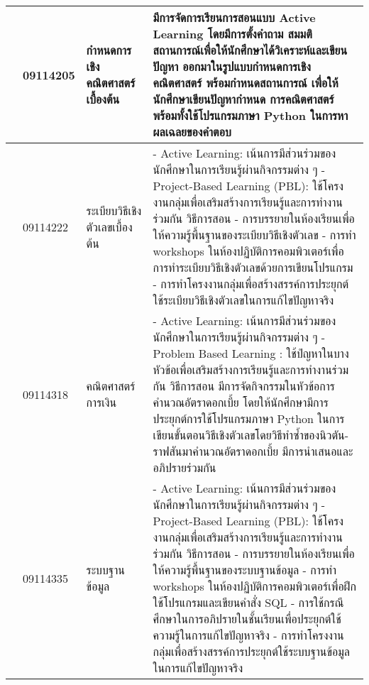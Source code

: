 {\begin{center}
\begin{longtable}{|p{}|p{}|p{}|p{}|}
	& 09114205
	& กำหนดการเชิงคณิตศาสตร์เบื้องต้น & มีการจัดการเรียนการสอนแบบ Active Learning โดยมีการตั้งคําถาม สมมติ สถานการณ์เพื่อให้นักศึกษาได้วิเคราะห์และเขียนปัญหา ออกมาในรูปแบบกําหนดการเชิงคณิตศาสตร์ พร้อมกำหนดสถานการณ์ เพื่อให้ นักศึกษาเขียนปัญหากําหนด การคณิตศาสตร์พร้อมทั้งใช้โปรแกรมภาษา Python ในการหาผลเฉลยของคําตอบ
	\\ 	
	\hline
	& 09114222
	& ระเบียบวิธีเชิงตัวเลขเบื้องต้น & - Active Learning: เน้นการมีส่วนร่วมของนักศึกษาในการเรียนรู้ผ่านกิจกรรมต่าง ๆ
	\newline- Project-Based Learning (PBL): ใช้โครงงานกลุ่มเพื่อเสริมสร้างการเรียนรู้และการทำงานร่วมกัน
	\newline วิธีการสอน
	\newline- การบรรยายในห้องเรียนเพื่อให้ความรู้พื้นฐานของระเบียบวิธีเชิงตัวเลข
	\newline- การทำ workshops ในห้องปฏิบัติการคอมพิวเตอร์เพื่อการทำระเบียบวิธีเชิงตัวเลขด้วยการเขียนโปรแกรม
	\newline- การทำโครงงานกลุ่มเพื่อสร้างสรรค์การประยุกต์ใช้ระเบียบวิธีเชิงตัวเลขในการแก้ไขปัญหาจริง
	\\ \cline{2-4}
	& 09114318
	& คณิตศาสตร์การเงิน & - Active Learning: เน้นการมีส่วนร่วมของนักศึกษาในการเรียนรู้ผ่านกิจกรรมต่าง ๆ
	\newline- Problem Based Learning : ใช้ปํญหาในบางหัวข้อเพื่อเสริมสร้างการเรียนรู้และการทำงานร่วมกัน
	\newline วิธีการสอน
	\newline มีการจัดกิจกรรมในหัวข้อการคำนวณอัตราดอกเบี้ย โดยให้นักศึกษามีการประยุกต์การใช้โปรแกรมภาษา Python ในการเขียนขั้นตอนวิธีเชิงตัวเลขโดยวิธีทำซ้ำของนิวตัน-ราฟสันมาคำนวณอัตราดอกเบี้ย มีการนำเสนอและอภิปรายร่วมกัน 
	\\ 
	\cline{2-4}
	& 09114335
	& ระบบฐานข้อมูล & - Active Learning: เน้นการมีส่วนร่วมของนักศึกษาในการเรียนรู้ผ่านกิจกรรมต่าง ๆ
	\newline- Project-Based Learning (PBL): ใช้โครงงานกลุ่มเพื่อเสริมสร้างการเรียนรู้และการทำงานร่วมกัน
	\newline วิธีการสอน
	\newline- การบรรยายในห้องเรียนเพื่อให้ความรู้พื้นฐานของระบบฐานข้อมูล
	\newline- การทำ workshops ในห้องปฏิบัติการคอมพิวเตอร์เพื่อฝึกใช้โปรแกรมและเขียนคำสั่ง SQL
	\newline- การใช้กรณีศึกษาในการอภิปรายในชั้นเรียนเพื่อประยุกต์ใช้ความรู้ในการแก้ไขปัญหาจริง
	\newline- การทำโครงงานกลุ่มเพื่อสร้างสรรค์การประยุกต์ใช้ระบบฐานข้อมูลในการแก้ไขปัญหาจริง

\end{longtable}
\end{center}}
